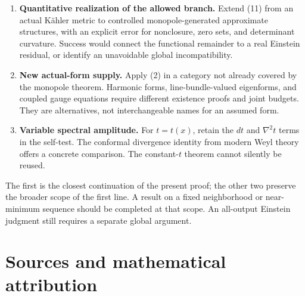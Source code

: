 \documentclass[
  11pt,
]{article}
\providecommand{\tightlist}{%
  \setlength{\itemsep}{0pt}\setlength{\parskip}{0pt}}
\begin{document}
\begin{enumerate}
\def\labelenumi{\arabic{enumi}.}
\tightlist
\item
  \textbf{Quantitative realization of the allowed branch.} Extend (11)
  from an actual Kähler metric to controlled monopole-generated
  approximate structures, with an explicit error for nonclosure, zero
  sets, and determinant curvature. Success would connect the functional
  remainder to a real Einstein residual, or identify an unavoidable
  global incompatibility.
\item
  \textbf{New actual-form supply.} Apply (2) in a category not already
  covered by the monopole theorem. Harmonic forms, line-bundle-valued
  eigenforms, and coupled gauge equations require different existence
  proofs and joint budgets. They are alternatives, not interchangeable
  names for an assumed form.
\item
  \textbf{Variable spectral amplitude.} For \(t=t(x)\), retain the
  \(dt\) and \(\nabla^2t\) terms in the self-test. The conformal
  divergence identity from modern Weyl theory offers a concrete
  comparison. The constant-\(t\) theorem cannot silently be reused.
\end{enumerate}

The first is the closest continuation of the present proof; the other
two preserve the broader scope of the first line. A result on a fixed
neighborhood or near-minimum sequence should be completed at that scope.
An all-output Einstein judgment still requires a separate global
argument.

\hypertarget{sources-and-mathematical-attribution}{%
\section{Sources and mathematical
attribution}\label{sources-and-mathematical-attribution}}
\end{document}

